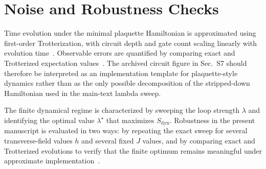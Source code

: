 \section{Noise and Robustness Checks}

Time evolution under the minimal plaquette Hamiltonian is approximated using first-order Trotterization, with circuit depth and gate count scaling linearly with evolution time~\cite{Trotter1959,Suzuki1990,Lloyd1996,Childs2019}. Observable errors are quantified by comparing exact and Trotterized expectation values~\cite{BerryAhokasCleveSanders2007}. The archived circuit figure in Sec.~S7 should therefore be interpreted as an implementation template for plaquette-style dynamics rather than as the only possible decomposition of the stripped-down Hamiltonian used in the main-text lambda sweep.

The finite dynamical regime is characterized by sweeping the loop strength $\lambda$ and identifying the optimal value $\lambda^\star$ that maximizes $S_{\mathrm{dyn}}$. Robustness in the present manuscript is evaluated in two ways: by repeating the exact sweep for several transverse-field values $h$ and several fixed $J$ values, and by comparing exact and Trotterized evolutions to verify that the finite optimum remains meaningful under approximate implementation~\cite{Childs2019}.

